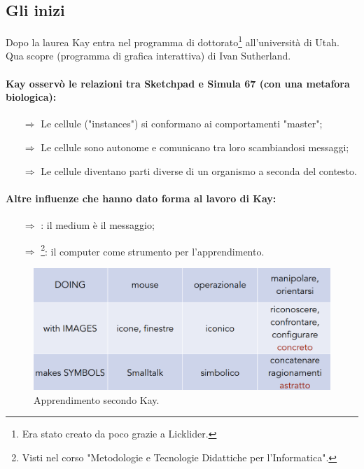 \subsection{Gli inizi}

Dopo la laurea Kay entra nel programma di dottorato\footnote{Era stato creato da poco grazie a Licklider.} all'università di Utah.
Qua scopre  (programma di grafica interattiva) di Ivan Sutherland.


\paragraph{Kay osservò le relazioni tra Sketchpad e Simula 67 (con una metafora biologica):}

\begin{itemize}
    \item [$\Rightarrow$] Le cellule ("instances") si conformano ai comportamenti "master";
    \item [$\Rightarrow$] Le cellule sono autonome e comunicano tra loro scambiandosi messaggi;
    \item [$\Rightarrow$] Le cellule diventano parti diverse di un organismo a seconda del contesto.
\end{itemize}


\paragraph{Altre influenze che hanno dato forma al lavoro di Kay:}

\begin{itemize}
    \item [$\Rightarrow$] : il medium è il messaggio;
    \item [$\Rightarrow$] \footnote{Visti nel corso "Metodologie
    e Tecnologie Didattiche per l'Informatica".}: il computer come strumento per l'apprendimento.
\end{itemize}

\begin{figure}[h]
    \centering
    \includegraphics[scale=0.45]{images/App.png}
    \caption{Apprendimento secondo Kay.}
\end{figure}


